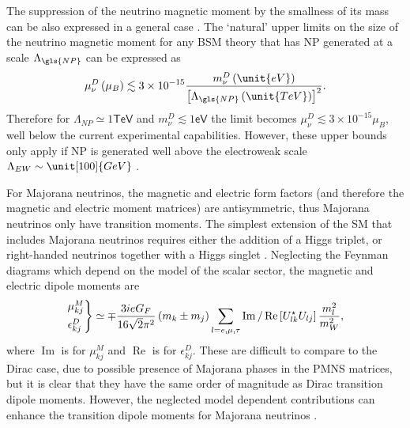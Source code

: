 The suppression of the neutrino magnetic moment by the smallness of its mass can be also expressed in a general case \cite{nuMMMajoranaBounds2006.pdf}. The `natural' upper limits on the size of the neutrino magnetic moment for any \gls{BSM} theory that has \gls{NP} generated at a scale $\Lambda_{\gls{NP}}$ can be expressed as \cite{NuMMDiracUpperBounds2005.pdf}
\begin{equation}
\mu_\nu^D\left(\mu_B\right)\lesssim 3\times 10^{-15}\frac{m_\nu^D\left(\unit{eV}\right)}{\left[\Lambda_{\gls{NP}}\left(\unit{TeV}\right)\right]^2}.
\end{equation}
Therefore for $\Lambda_{NP}\simeq 1\textsf{TeV}$ and $m_{\nu}^D\lesssim 1\textsf{eV}$ the limit becomes $\mu_{\nu}^D\lesssim 3\times 10^{-15}\mu_B$, well below the current experimental capabilities. However, these upper bounds only apply if \gls{NP} is generated well above the electroweak scale $\Lambda_{EW}\sim\unit[100]{GeV}$ \cite{nuElmagInt2015.pdf}.

For Majorana neutrinos, the magnetic and electric form factors (and therefore the magnetic and electric moment matrices) are antisymmetric, thus Majorana neutrinos only have transition moments. The simplest extension of the \gls{SM} that includes Majorana neutrinos requires either the addition of a Higgs triplet, or right-handed neutrinos together with a Higgs singlet \cite{nuElmagInt2015.pdf}. Neglecting the Feynman diagrams which depend on the model of the scalar sector, the magnetic and electric dipole moments are
\begin{equation}\label{eq:MajoranaMagMomExpression}
\begin{rcases}
\mu^M_{kj}\\
\epsilon^D_{kj}
\end{rcases}
\simeq\mp\frac{3ieG_F}{16\sqrt{2}\pi^2}\left(m_k\pm m_j\right)\sum_{l=e,\mu ,\tau}\operatorname{Im}/\operatorname{Re}\left[U^{\star}_{lk}U_{lj}\right]\frac{m_l^2}{m_W^2},
\end{equation}
where $\operatorname{Im}$ is for $\mu^M_{kj}$ and $\operatorname{Re}$ is for $\epsilon^D_{kj}$. These are difficult to compare to the Dirac case, due to possible presence of Majorana phases in the \gls{PMNS} matrices, but it is clear that they have the same order of magnitude as Dirac transition dipole moments. However, the neglected model dependent contributions can enhance the transition dipole moments for Majorana neutrinos \cite{nuElmagInt2015.pdf}.

